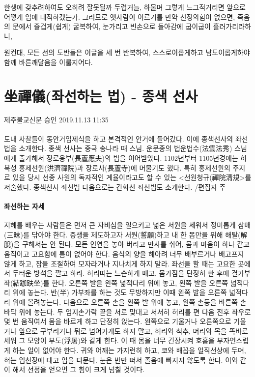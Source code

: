 \documentclass[12pt, a4paper, oneside]{book}
\let\stdsection\section
\renewcommand\section{\newpage\stdsection}
\begin{document}
한생에 갖추려하여도 오히려 잘못될까 두렵거늘, 하물며 그렇게 느그적거리면 앞으로 어떻게 업에 대적하겠는가. 그러므로 옛사람이 이르기를 만약 선정의힘이 없으면, 죽음의 문에서 즐겁게(쉽게) 굴복하여, 눈가리고 빈손으로 돌아감에 굽이굽이 흘러가리라하니,

원컨대, 모든 선의 도반들은 이글을 세 번 반복하여, 스스로이롭게하고 남도이롭게하야 함께 바른깨달음을 이룰지어다.


%
	\section{坐禪儀(좌선하는 법) - 종색 선사 }

 제주불교신문 승인 2019.11.13 11:35 

\paragraph{}
도내 사찰들이 동안거입제식을 하고 본격적인 안거에 들어갔다. 이에 종색선사의 좌선법을 소개한다.  종색 선사는 중국 송나라 때 스님. 운문종의 법운법수(法雲法秀) 스님에게 출가해서 장로응부(長蘆應夫)의 법을 이어받았다. 1102년부터 1105년경에는 하북성 홍제선원(洪濟禪院)과 장로사(長蘆寺)에 머물기도 했다. 특히 홍제선원의 주지로 있을 당시 선종 사원의 독자적인 계율이라고도 할 수 있는 <선원청규(禪院淸規>를 저술했다. 종색선사 좌선법 다음으로는 간화선 좌선법도 소개한다. /편집자 주

 

\paragraph{좌선하는 자세}
지혜를 배우는 사람들은 먼저 큰 자비심을 일으키고 넓은 서원을 세워서 정미롭게 삼매(三昧)를 닦아야 한다. 중생을 제도하고자 서원(誓願)하고 내 한 몸만을 위해 해탈(解脫)을 구해서는 안 된다.
모든 인연을 놓아 버리고 만사를 쉬어, 몸과 마음이 하나 같고 움직이고 고요함에 틈이 없어야 한다. 음식의 양을 헤아려 너무 배부르거나 배고프지 않게 하고, 잠을 조절하여 모자라거나 지나치게 하지 말라.
좌선을 할 때는 고요한 곳에서 두터운 방석을 깔고 하라. 허리띠는 느슨하게 매고, 몸가짐을 단정히 한 후에 결가부좌(結跏趺坐)를 한다.
오른쪽 발을 왼쪽 넓적다리 위에 놓고, 왼쪽 발을 오른쪽 넓적다리 위에 놓는다. 반(半) 가부좌를 하는 것도 무방하지만 이때 왼쪽 발을 오른쪽 넓적다리 위에 올려놓는다.
다음으로 오른쪽 손을 왼쪽 발 위에 놓고, 왼쪽 손등을 바른쪽 손바닥 위에 놓는다. 두 엄지손가락 끝을 서로 맞대고 서서히 허리를 편 다음 전후 좌우로 몇 번 움직여서 몸을 바르게 하고 단정히 앉는다.
왼쪽으로 기울거나 오른쪽으로 기울거나 앞으로 구부리거나 뒤로 넘어가게도 하지 말고, 허리와 척추, 머리와 목을 똑바로 세워 그 모양이 부도(浮屠)와 같게 한다. 이 때 몸을 너무 긴장시켜 호흡을 부자연스럽게 하는 일이 없어야 한다. 귀와 어깨는 가지런히 하고, 코와 배꼽을 일직선상에 두며, 혀는 입천장에 대고 입을 다문다. 눈은 반만 떠서 졸음에 빠지지 않도록 한다. 이와 같이 해서 선정을 얻으면 그 힘이 크게 넘칠 것이다.
\end{document}
